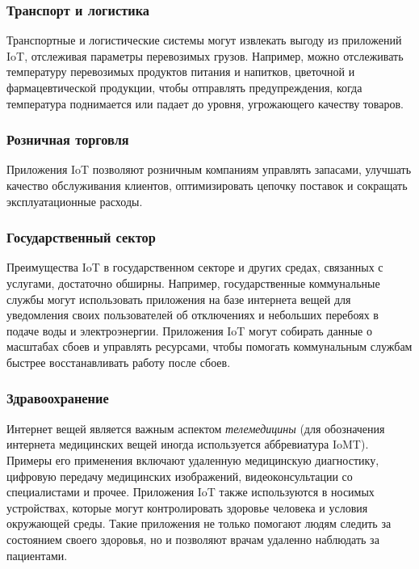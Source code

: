 \subsubsection{Транспорт и логистика}

Транспортные и логистические системы могут извлекать выгоду из приложений IoT, отслеживая параметры перевозимых грузов. Например, можно отслеживать температуру перевозимых продуктов питания и напитков, цветочной и фармацевтической продукции, чтобы отправлять предупреждения, когда температура поднимается или падает до уровня, угрожающего качеству товаров.
	
\subsubsection{Розничная торговля}

Приложения IoT позволяют розничным компаниям управлять запасами, улучшать качество обслуживания клиентов, оптимизировать цепочку поставок и сокращать эксплуатационные расходы.

\subsubsection{Государственный сектор}

Преимущества IoT в государственном секторе и других средах, связанных с услугами, достаточно обширны. Например, государственные коммунальные службы могут использовать приложения на базе интернета вещей для уведомления своих пользователей об отключениях и небольших перебоях в подаче воды и электроэнергии. Приложения IoT могут собирать данные о масштабах сбоев и управлять ресурсами, чтобы помогать коммунальным службам быстрее восстанавливать работу после сбоев.

\subsubsection{Здравоохранение}

Интернет вещей является важным аспектом \textit{телемедицины} \cite{Kaspersky} (для обозначения интернета медицинских вещей иногда используется аббревиатура IoMT). Примеры его применения включают удаленную медицинскую диагностику, цифровую передачу медицинских изображений, видеоконсультации со специалистами и прочее. Приложения IoT также используются в носимых устройствах, которые могут контролировать здоровье человека и условия окружающей среды. Такие приложения не только помогают людям следить за состоянием своего здоровья, но и позволяют врачам удаленно наблюдать за пациентами.

